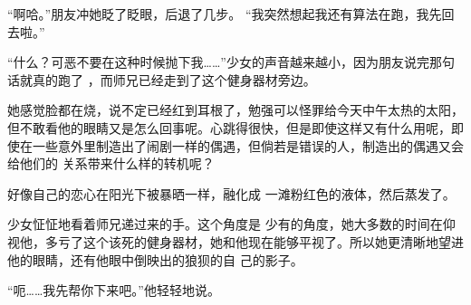 \documentclass{article}
\begin{document}
“啊哈。”朋友冲她眨了眨眼，后退了几步。
“我突然想起我还有算法在跑，我先回去啦。” 

“什么？可恶不要在这种时候抛下我……”少女的声音越来越小，因为朋友说完那句话就真的跑了
，而师兄已经走到了这个健身器材旁边。 

她感觉脸都在烧，说不定已经红到耳根了，勉强可以怪罪给今天中午太热的太阳，但不敢看他的眼睛又是怎么回事呢。心跳得很快，但是即使这样又有什么用呢，即使在一些意外里制造出了闹剧一样的偶遇，但倘若是错误的人，制造出的偶遇又会给他们的
关系带来什么样的转机呢？ 

好像自己的恋心在阳光下被暴晒一样，融化成
一滩粉红色的液体，然后蒸发了。 

少女怔怔地看着师兄递过来的手。这个角度是
\newpage
少有的角度，她大多数的时间在仰视他，多亏了这个该死的健身器材，她和他现在能够平视了。所以她更清晰地望进他的眼睛，还有他眼中倒映出的狼狈的自
己的影子。 

“呃……我先帮你下来吧。”他轻轻地说。
\end{document}

